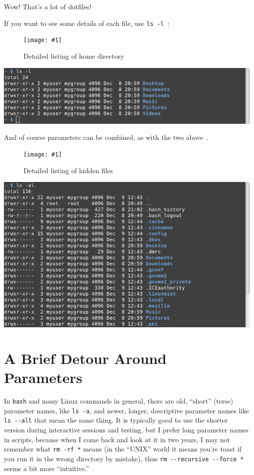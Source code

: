 \documentclass[10pt,]{book}
\numberwithin{figure}{chapter}
\DeclareRobustCommand{\fimg}[3]{
\ifxetex
\begin{figure}[H]
\texttt{[image: \#1]}
\caption{#2}
\label{fig:#3}
\end{figure}
\fi}
\DeclareRobustCommand{\fref}[1]{\ifxetex{(Figure \ref{fig:#1})}\fi}
\begin{document}
Wow! That's a lot of dotfiles!

If you want to see some details of each file, use
\texttt{ls -l}~\fref{ls-l-home}:

\ifxetex\fimg{./images/ls-l-home.png}{Detailed listing of home directory}{ls-l-home}
\else
\includegraphics{./images/ls-l-home.png} \fi

And of course parameters can be combined, as with the two
above~\fref{ls-al-home}.

\ifxetex\fimg{./images/ls-al-home.png}{Detailed listing of hidden files}{ls-al-home}
\else
\includegraphics{./images/ls-al-home.png} \fi

\section{A Brief Detour Around
Parameters}\label{a-brief-detour-around-parameters}

In \texttt{bash} and many Linux commands in general, there are old,
``short'' (terse) parameter names, like \texttt{ls -a}, and newer,
longer, descriptive parameter names like \texttt{ls -{}-all} that mean
the same thing. It is typically good to use the shorter version during
interactive sessions and testing, but I prefer long parameter names in
scripts, because when I come back and look at it in two years, I may not
remember what \texttt{rm -rf *} means (in the ``UNIX'' world it means
you're toast if you run it in the wrong directory by mistake), thus
\texttt{rm -{}-recursive -{}-force *} seems a bit more ``intuitive.''
\end{document}
